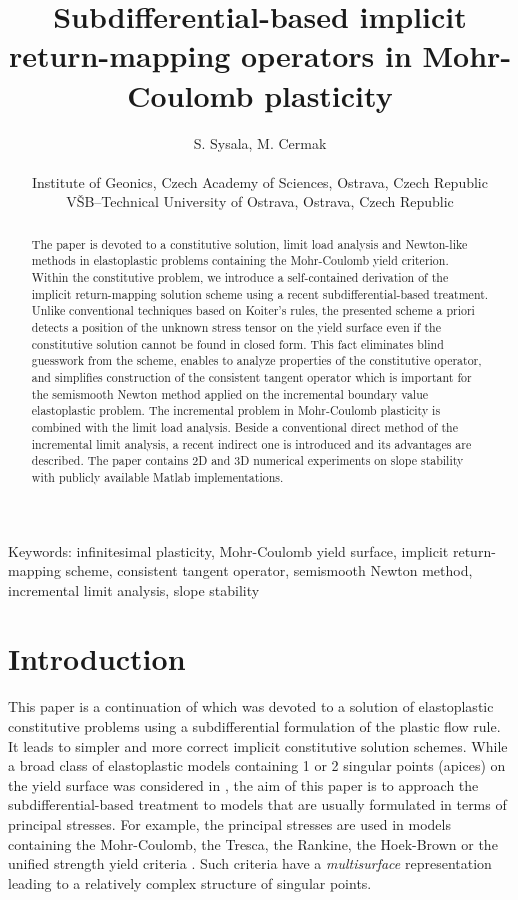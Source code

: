 \documentclass[a4paper,12pt]{article}
\title{Subdifferential-based implicit return-mapping operators in Mohr-Coulomb plasticity}
\author{S. Sysala, M. Cermak \\ \\ Institute of Geonics, Czech Academy of Sciences, Ostrava, Czech
Republic\\ V\v SB--Technical University of Ostrava, Ostrava, Czech Republic}
\theoremstyle{remark}
\numberwithin{equation}{section}
\begin{document}
\maketitle

\begin{abstract}
The paper is devoted to a constitutive solution, limit load analysis and Newton-like methods in elastoplastic problems containing the Mohr-Coulomb yield criterion. Within the constitutive problem, we introduce a self-contained derivation of the implicit return-mapping solution scheme using a recent subdifferential-based treatment. Unlike conventional techniques based on Koiter's rules, the presented scheme a priori detects a position of the unknown stress tensor on the yield surface even if the constitutive solution cannot be found in closed form. This fact eliminates blind guesswork from the scheme, enables to analyze properties of the constitutive operator, and simplifies construction of the consistent tangent operator which is important for the semismooth Newton method applied on the incremental boundary value elastoplastic problem. The incremental problem in Mohr-Coulomb plasticity is combined with the limit load analysis. Beside a conventional direct method of the incremental limit analysis, a recent indirect one is introduced and its advantages are described. The paper contains 2D and 3D numerical experiments on slope stability with publicly available Matlab implementations.

\end{abstract}

\noindent
Keywords: infinitesimal plasticity, Mohr-Coulomb yield surface, implicit return-mapping scheme, consistent tangent operator, semismooth Newton method, incremental limit analysis, slope stability


\section{Introduction}

This paper is a continuation of \cite{SCKKZB15} which was devoted to a solution of elastoplastic constitutive problems using a subdifferential formulation of the plastic flow rule. It leads to simpler and more correct implicit constitutive solution schemes. While a broad class of elastoplastic models containing 1 or 2 singular points (apices) on the yield surface was considered in \cite{SCKKZB15}, the aim of this paper is to approach the subdifferential-based treatment to models that are usually formulated in terms of principal stresses.  For example, the principal stresses are used in models containing the Mohr-Coulomb, the Tresca, the Rankine, the Hoek-Brown or the unified strength yield criteria \cite{NPO08,CDA15,LL15,LR96}. Such criteria have a {\it multisurface} representation leading to a relatively complex structure of singular points. 
\end{document}

